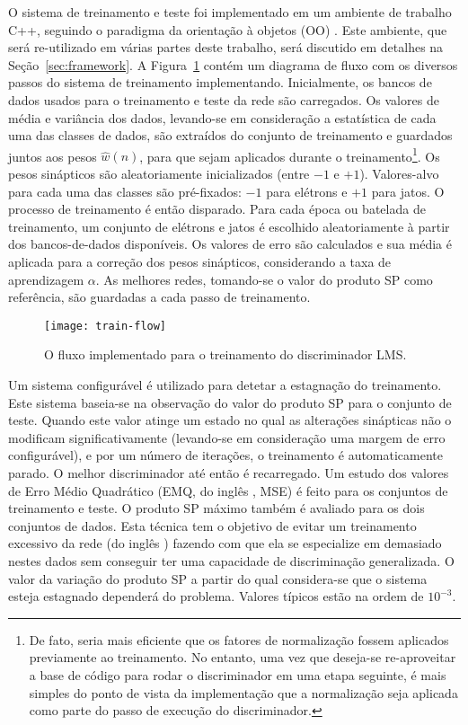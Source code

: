 O sistema de treinamento e teste foi implementado em um ambiente de trabalho
C++, seguindo o paradigma da orientação à objetos (OO) \cite{stroustrup,
booch}. Este ambiente, que será re-utilizado em várias partes deste trabalho,
será discutido em detalhes na Seção~\ref{sec:framework}. A
Figura~\ref{fig:train-flow} contém um diagrama de fluxo com os diversos passos
do sistema de treinamento implementando. Inicialmente, os bancos de dados
usados para o treinamento e teste da rede são carregados. Os valores de média
e variância dos dados, levando-se em consideração a estatística de cada uma
das classes de dados, são extraídos do conjunto de treinamento e guardados
juntos aos pesos $\hat{w}(n)$, para que sejam aplicados durante o
treinamento\footnote{De fato, seria mais eficiente que os fatores de
normalização fossem aplicados previamente ao treinamento. No entanto, uma vez
que deseja-se re-aproveitar a base de código para rodar o discriminador em uma
etapa seguinte, é mais simples do ponto de vista da implementação que a
normalização seja aplicada como parte do passo de execução do
discriminador.}. Os pesos sinápticos são aleatoriamente inicializados (entre
$-1$ e $+1$). Valores-alvo para cada uma das classes são pré-fixados: $-1$
para elétrons e $+1$ para jatos. O processo de treinamento é então
disparado. Para cada época ou batelada de treinamento, um conjunto de elétrons
e jatos é escolhido aleatoriamente à partir dos bancos-de-dados
disponíveis. Os valores de erro são calculados e sua média é aplicada para a
correção dos pesos sinápticos, considerando a taxa de aprendizagem
$\alpha$. As melhores redes, tomando-se o valor do produto SP como referência,
são guardadas a cada passo de treinamento. 

\begin{figure}
\begin{center}
\texttt{[image: train-flow]}
\end{center}
\caption{O fluxo implementado para o treinamento do discriminador LMS.}
\label{fig:train-flow}
\end{figure}

Um sistema configurável é utilizado para detetar a estagnação do
treinamento. Este sistema baseia-se na observação do valor do produto SP para
o conjunto de teste. Quando este valor atinge um estado no qual as alterações
sinápticas não o modificam significativamente (levando-se em consideração uma
margem de erro configurável), e por um número de iterações, o treinamento é
automaticamente parado. O melhor discriminador até então é recarregado. Um
estudo dos valores de Erro Médio Quadrático (EMQ, do inglês , MSE) é feito para os conjuntos de treinamento e teste. O produto SP
máximo também é avaliado para os dois conjuntos de dados. Esta técnica tem o
objetivo de evitar um treinamento excessivo da rede (do inglês
) fazendo com que ela se especialize em demasiado nestes
dados sem conseguir ter uma capacidade de discriminação generalizada. O valor
da variação do produto SP a partir do qual considera-se que o sistema esteja
estagnado dependerá do problema. Valores típicos estão na ordem de $10^{-3}$.

